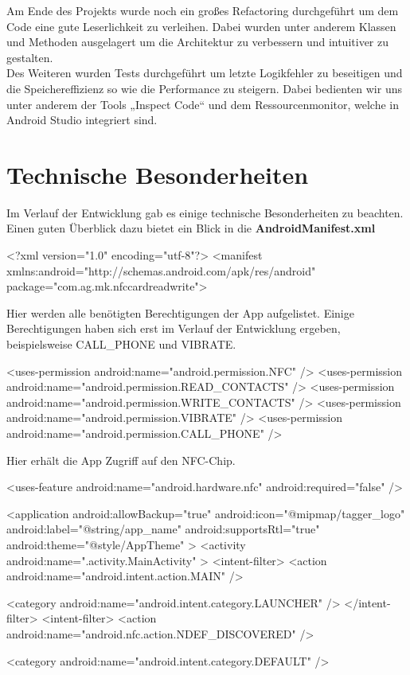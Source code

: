 \documentclass[a4paper,ngerman,12pt]{scrreprt}
\newcommand{\+}{\discretionary{\mbox{\scriptsize$\hookleftarrow$}}{}{}}
\begin{document}
Am Ende des Projekts wurde noch ein großes Refactoring durchgeführt um dem Code eine gute Leserlichkeit zu verleihen. Dabei wurden unter anderem Klassen und Methoden ausgelagert um die Architektur zu verbessern und intuitiver zu gestalten. \\
Des Weiteren wurden Tests durchgeführt um letzte Logikfehler zu beseitigen und die Speichereffizienz so wie die Performance zu steigern. Dabei bedienten wir uns unter anderem der Tools „\+Inspect Code“ und dem Ressourcenmonitor, welche in Android Studio integriert sind.

\section{Technische Besonderheiten}

Im Verlauf der Entwicklung gab es einige technische Besonderheiten zu beachten. Einen guten Überblick dazu bietet ein Blick in die {\bfseries Android\+Manifest.\+xml} \begin{DoxyVerb}<?xml version="1.0" encoding="utf-8"?>
<manifest xmlns:android="http://schemas.android.com/apk/res/android"
    package="com.ag.mk.nfccardreadwrite">
\end{DoxyVerb}


Hier werden alle benötigten Berechtigungen der App aufgelistet. Einige Berechtigungen haben sich erst im Verlauf der Entwicklung ergeben, beispielsweise C\+A\+L\+L\+\_\+\+P\+H\+O\+NE und V\+I\+B\+R\+A\+TE. \begin{DoxyVerb}    <uses-permission android:name="android.permission.NFC" />
    <uses-permission android:name="android.permission.READ_CONTACTS" />
    <uses-permission android:name="android.permission.WRITE_CONTACTS" />
    <uses-permission android:name="android.permission.VIBRATE" />
    <uses-permission android:name="android.permission.CALL_PHONE" />
\end{DoxyVerb}


Hier erhält die App Zugriff auf den N\+F\+C-\/\+Chip. \begin{DoxyVerb}    <uses-feature
        android:name="android.hardware.nfc"
        android:required="false" />

    <application
        android:allowBackup="true"
        android:icon="@mipmap/tagger_logo"
        android:label="@string/app_name"
        android:supportsRtl="true"
        android:theme="@style/AppTheme" >
        <activity android:name=".activity.MainActivity" >
            <intent-filter>
                <action android:name="android.intent.action.MAIN" />

                <category android:name="android.intent.category.LAUNCHER" />
            </intent-filter>
            <intent-filter>
                <action android:name="android.nfc.action.NDEF_DISCOVERED" />

                <category android:name="android.intent.category.DEFAULT" />
\end{DoxyVerb}
\end{document}
